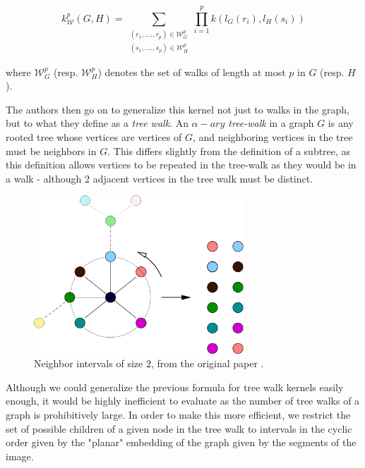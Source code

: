 \[
k_{\mathcal{W}}^p(G,H) = \sum_{\substack{(r_1, ...., r_p) \in \mathcal{W}_G^p\\ (s_1, ...., s_p) \in \mathcal{W}_H^p}} \prod_{i=1}^p k(l_G(r_i), l_H(s_i))
\]

where $\mathcal{W}_G^p$ (resp. $\mathcal{W}_H^p$) denotes the set of walks of length at most $p$ in $G$ (resp. $H$).

The authors then go on to generalize this kernel not just to walks in the graph, but to what they define as a \emph{tree walk}. An \emph{$\alpha-ary$ tree-walk} in a graph $G$ is any rooted tree whose vertices are vertices of $G$, and neighboring vertices in the tree must be neighbors in $G$. This differs slightly from the definition of a subtree, as this definition allows vertices to be repeated in the tree-walk as they would be in a walk - although 2 adjacent vertices in the tree walk must be distinct.

\begin{figure}[htb!]
\includegraphics[width=0.7\textwidth]{images/neighborIntervals.png}
\caption{Neighbor intervals of size $2$, from the original paper \cite{harchaoui2007image}.}
\end{figure}

Although we could generalize the previous formula for tree walk kernels easily enough, it would be highly inefficient to evaluate as the number of tree walks of a graph is prohibitively large. In order to make this more efficient, we restrict the set of possible children of a given node in the tree walk to intervals in the cyclic order given by the "planar" embedding of the graph given by the segments of the image.

